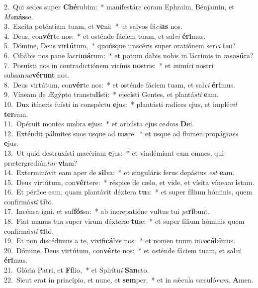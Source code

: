 {2.~}Qui sedes super \textbf{Ché}rubim:~* manifestáre coram Ephraim, Bénjamin, et \textit{Ma}\textbf{nás}se.\\
{3.~}Excita poténtiam tuam, et \textbf{ve}ni:~* ut salvos fá\textit{ci}\textbf{as} nos.\\
{4.~}Deus, con\textbf{vér}te nos:~* et osténde fáciem tuam, et sal\textit{vi} \textbf{é}\textbf{ri}mus.\\
{5.~}Dómine, Deus vir\textbf{tú}tum,~* quoúsque irascéris super oratiónem ser\textit{vi} \textbf{tu}i?\\
{6.~}Cibábis nos pane lacri\textbf{má}rum:~* et potum dabis nobis in lácrimis in \textit{men}\textbf{sú}ra?\\
{7.~}Posuísti nos in contradictiónem vicínis \textbf{no}stris:~* et inimíci nostri subsan\textit{na}\textbf{vé}\textbf{runt} nos.\\
{8.~}Deus virtútum, con\textbf{vér}te nos:~* et osténde fáciem tuam, et sal\textit{vi} \textbf{é}\textbf{ri}mus.\\
{9.~}Víneam de Ægýpto transtu\textbf{lí}sti:~* ejecísti Gentes, et plantá\textit{sti} \textbf{e}am.\\
{10.~}Dux itíneris fuísti in conspéctu \textbf{e}jus:~* plantásti radíces ejus, et implé\textit{vit} \textbf{ter}ram.\\
{11.~}Opéruit montes umbra \textbf{e}jus:~* et arbústa ejus ce\textit{dros} \textbf{De}i.\\
{12.~}Exténdit pálmites suos usque ad \textbf{ma}re:~* et usque ad flumen propági\textit{nes} \textbf{e}jus.\\
{13.~}Ut quid destruxísti macériam \textbf{e}jus:~* et vindémiant eam omnes, qui prætergrediún\textit{tur} \textbf{vi}am?\\
{14.~}Exterminávit eam aper de \textbf{sil}va:~* et singuláris ferus depástus \textit{est} \textbf{e}am.\\
{15.~}Deus virtútum, con\textbf{vér}tere:~* réspice de cælo, et vide, et vísita víne\textit{am} \textbf{i}stam.\\
{16.~}Et pérfice eam, quam plantávit déxtera \textbf{tu}a:~* et super fílium hóminis, quem confirmá\textit{sti} \textbf{ti}bi.\\
{17.~}Incénsa igni, et suf\textbf{fós}sa:~* ab increpatióne vultus tui \textit{pe}\textbf{rí}bunt.\\
{18.~}Fiat manus tua super virum déxteræ \textbf{tu}æ:~* et super fílium hóminis quem confirmá\textit{sti} \textbf{ti}bi.\\
{19.~}Et non discédimus a te, vivifi\textbf{cá}bis nos:~* et nomen tuum in\textit{vo}\textbf{cá}\textbf{bi}mus.\\
{20.~}Dómine, Deus virtútum, con\textbf{vér}te nos:~* et osténde fáciem tuam, et sal\textit{vi} \textbf{é}\textbf{ri}mus.\\
{21.~}Glória Patri, et \textbf{Fí}lio,~* et Spirítu\textit{i} \textbf{San}cto.\\
{22.~}Sicut erat in princípio, et nunc, et \textbf{sem}per,~* et in sǽcula sæculó\textit{rum}. \textbf{A}men.\\
